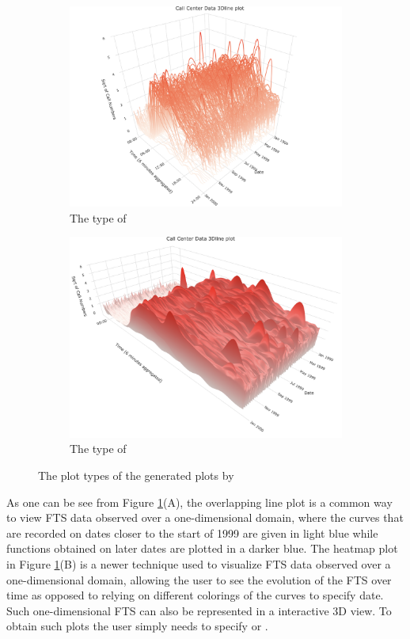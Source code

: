 \begin{figure}[ht!]
\begin{subfigure}[b]{0.49\textwidth}
		\includegraphics[width=\textwidth]{figures/3Dline.png}
		\caption{The type of }
	\end{subfigure}
	\begin{subfigure}[b]{0.49\textwidth}
		\includegraphics[width=\textwidth]{figures/3Dsurface.png}
		\caption{The type of }
	\end{subfigure}
	\caption{The plot types of the generated plots by }
	\label{fig:call_center}
\end{figure}

As one can be see from Figure \ref{fig:call_center}(A), the overlapping line plot is 
a common way to view FTS data observed over a one-dimensional domain, where the 
curves that are recorded on dates closer to the start of 1999 are given in light 
blue while functions obtained on later dates are plotted in a darker blue. The 
heatmap plot in Figure \ref{fig:call_center}(B) is a newer technique used to 
visualize FTS data observed over a one-dimensional domain, allowing the user to see 
the evolution of the FTS over time as opposed to relying on different colorings of 
the curves to specify date. Such one-dimensional FTS can also be represented in a 
interactive 3D view. To obtain such plots the user simply needs to specify 
 or .

